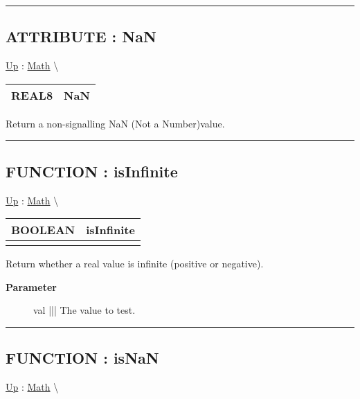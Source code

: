 \rule{\linewidth}{0.5pt}
\subsection*{ATTRIBUTE : NaN}
\hypertarget{ecldoc:math.nan}{}
\hyperlink{ecldoc:Math}{Up} :
\hspace{0pt} \hyperlink{ecldoc:Math}{Math} \textbackslash 

{\renewcommand{\arraystretch}{1.5}
\begin{tabularx}{\textwidth}{|>{\raggedright\arraybackslash}l|X|}
\hline
\hspace{0pt}REAL8 & NaN \\
\hline
\end{tabularx}
}

\par
Return a non-signalling NaN (Not a Number)value.


\rule{\linewidth}{0.5pt}
\subsection*{FUNCTION : isInfinite}
\hypertarget{ecldoc:math.isinfinite}{}
\hyperlink{ecldoc:Math}{Up} :
\hspace{0pt} \hyperlink{ecldoc:Math}{Math} \textbackslash 

{\renewcommand{\arraystretch}{1.5}
\begin{tabularx}{\textwidth}{|>{\raggedright\arraybackslash}l|X|}
\hline
\hspace{0pt}BOOLEAN & isInfinite \\
\hline
\multicolumn{2}{|>{\raggedright\arraybackslash}X|}{\hspace{0pt}(REAL8 val)} \\
\hline
\end{tabularx}
}

\par
Return whether a real value is infinite (positive or negative).

\par
\begin{description}
\item [\textbf{Parameter}] val ||| The value to test.
\end{description}

\rule{\linewidth}{0.5pt}
\subsection*{FUNCTION : isNaN}
\hypertarget{ecldoc:math.isnan}{}
\hyperlink{ecldoc:Math}{Up} :
\hspace{0pt} \hyperlink{ecldoc:Math}{Math} \textbackslash 

